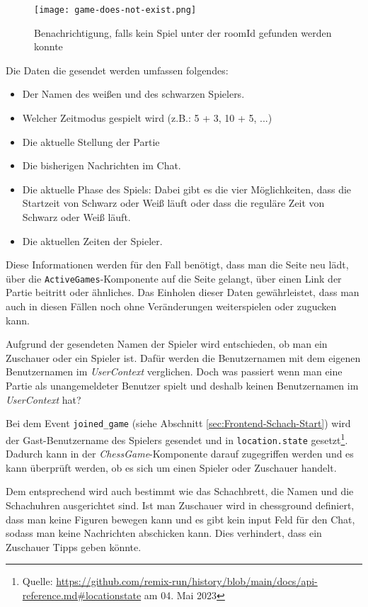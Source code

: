 \begin{figure}[h]
\centering
\texttt{[image: game-does-not-exist.png]}
\caption{Benachrichtigung, falls kein Spiel unter der roomId gefunden werden konnte}
\label{fig:game-does-not-exist}
\end{figure}

Die Daten die gesendet werden umfassen folgendes:
\begin{itemize}
\item Der Namen des weißen und des schwarzen Spielers.
\item Welcher Zeitmodus gespielt wird (z.B.: 5 + 3, 10 + 5, ...)
\item Die aktuelle Stellung der Partie
\item Die bisherigen Nachrichten im Chat.
\item Die aktuelle Phase des Spiels: Dabei gibt es die vier Möglichkeiten, dass die Startzeit von Schwarz oder Weiß läuft oder dass die reguläre Zeit von Schwarz oder Weiß läuft.
\item Die aktuellen Zeiten der Spieler.
\end{itemize}
Diese Informationen werden für den Fall benötigt, dass man die Seite neu lädt, über die \verb|ActiveGames|-Komponente auf die Seite gelangt, über einen Link der Partie beitritt oder ähnliches. Das Einholen dieser Daten gewährleistet, dass man auch in diesen Fällen noch ohne Veränderungen weiterspielen oder zugucken kann.

Aufgrund der gesendeten Namen der Spieler wird entschieden, ob man ein Zuschauer oder ein Spieler ist.  Dafür werden die Benutzernamen mit dem eigenen Benutzernamen im \textit{UserContext} verglichen. Doch was passiert wenn man eine Partie als unangemeldeter Benutzer spielt und deshalb keinen Benutzernamen im \textit{UserContext} hat?

Bei dem Event \verb|joined_game| (siehe Abschnitt \ref{sec:Frontend-Schach-Start}) wird der Gast-Benutzername des Spielers gesendet und in \verb|location.state| gesetzt\footnote{Quelle: \url{https://github.com/remix-run/history/blob/main/docs/api-reference.md\#locationstate} am 04. Mai 2023}. Dadurch kann in der \textit{ChessGame}-Komponente darauf zugegriffen werden und es kann überprüft werden, ob es sich um einen Spieler oder Zuschauer handelt.


Dem entsprechend wird auch bestimmt wie das Schachbrett, die Namen und die Schachuhren ausgerichtet sind. Ist man Zuschauer wird in chessground definiert, dass man keine Figuren bewegen kann und es gibt kein input Feld für den Chat, sodass man keine Nachrichten abschicken kann. Dies verhindert, dass ein Zuschauer Tipps geben könnte.

